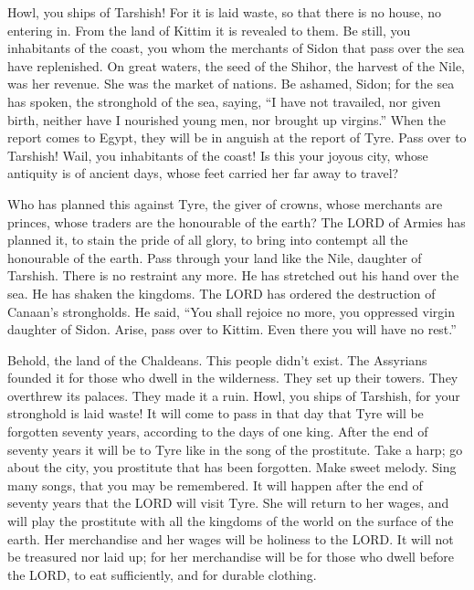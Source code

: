 Howl, you ships of Tarshish! For it is laid waste, so that there is no
house, no entering in. From the land of Kittim it is revealed to them.
 Be still, you inhabitants of the coast, you whom the
merchants of Sidon that pass over the sea have replenished.
 On great waters, the seed of the Shihor, the harvest of
the Nile, was her revenue. She was the market of nations. 
Be ashamed, Sidon; for the sea has spoken, the stronghold of the sea,
saying, ``I have not travailed, nor given birth, neither have I
nourished young men, nor brought up virgins.''  When the
report comes to Egypt, they will be in anguish at the report of Tyre.
 Pass over to Tarshish! Wail, you inhabitants of the
coast!  Is this your joyous city, whose antiquity is of
ancient days, whose feet carried her far away to travel?

 Who has planned this against Tyre, the giver of crowns,
whose merchants are princes, whose traders are the honourable of the
earth?  The LORD of Armies has planned it, to stain the
pride of all glory, to bring into contempt all the honourable of the
earth.  Pass through your land like the Nile, daughter of
Tarshish. There is no restraint any more.  He has
stretched out his hand over the sea. He has shaken the kingdoms. The
LORD has ordered the destruction of Canaan's strongholds.
 He said, ``You shall rejoice no more, you oppressed
virgin daughter of Sidon. Arise, pass over to Kittim. Even there you
will have no rest.''

 Behold, the land of the Chaldeans. This people didn't
exist. The Assyrians founded it for those who dwell in the wilderness.
They set up their towers. They overthrew its palaces. They made it a
ruin.  Howl, you ships of Tarshish, for your stronghold
is laid waste!  It will come to pass in that day that
Tyre will be forgotten seventy years, according to the days of one king.
After the end of seventy years it will be to Tyre like in the song of
the prostitute.  Take a harp; go about the city, you
prostitute that has been forgotten. Make sweet melody. Sing many songs,
that you may be remembered.  It will happen after the end
of seventy years that the LORD will visit Tyre. She will return to her
wages, and will play the prostitute with all the kingdoms of the world
on the surface of the earth.  Her merchandise and her
wages will be holiness to the LORD. It will not be treasured nor laid
up; for her merchandise will be for those who dwell before the LORD, to
eat sufficiently, and for durable clothing.

